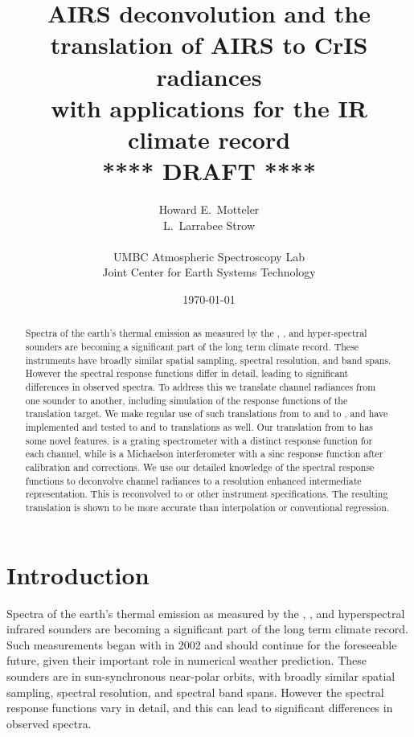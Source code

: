 \documentclass[10pt,twocolumn]{article}
\title{AIRS deconvolution and the \\
       translation of AIRS to CrIS radiances \\ 
       with applications for the IR climate record \\
  \vspace{3mm}
  {****} DRAFT {****}\\
}
\author{Howard E.~Motteler \\
  L.~Larrabee Strow \\
  \\
  UMBC Atmospheric Spectroscopy Lab \\
  Joint Center for Earth Systems Technology \\
}
\date{\today}
\begin{document}
\maketitle

\begin{abstract}

Spectra of the earth's thermal emission as measured by the {\airs},
{\cris}, and {\iasi} hyper-spectral sounders are becoming a
significant part of the long term climate record.  These instruments
have broadly similar spatial sampling, spectral resolution, and band
spans.  However the spectral response functions differ in detail,
leading to significant differences in observed spectra.  To address
this we translate channel radiances from one sounder to another,
including simulation of the response functions of the translation
target.  We make regular use of such translations from {\airs} to
{\cris} and {\iasi} to {\cris}, and have implemented and tested
{\iasi} to {\airs} and {\cris} to {\airs} translations as well.  
Our translation from {\airs} to {\cris} has some novel features.
{\airs} is a grating spectrometer with a distinct response function
for each channel, while {\cris} is a Michaelson interferometer with
a sinc response function after calibration and corrections.  We use
our detailed knowledge of the {\airs} spectral response functions to
deconvolve {\airs} channel radiances to a resolution enhanced
intermediate representation.  This is reconvolved to {\cris} or
other instrument specifications.  The resulting translation is shown
to be more accurate than interpolation or conventional regression.

\end{abstract}

\section{Introduction}

Spectra of the earth's thermal emission as measured by the {\airs}
\cite{airs1}, {\cris} \cite{cris1,cris2}, and {\iasi} \cite{iasi1}
hyperspectral infrared sounders are becoming a significant part of
the long term climate record.  Such measurements began with {\airs}
in 2002 and should continue for the foreseeable future, given their
important role in numerical weather prediction.  These sounders are
in sun-synchronous near-polar orbits, with broadly similar spatial
sampling, spectral resolution, and spectral band spans.  However the
spectral response functions vary in detail, and this can lead to
significant differences in observed spectra.
\end{document}
